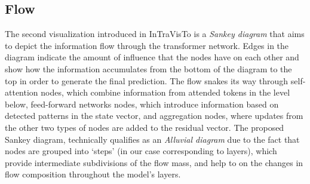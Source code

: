 \subsection{Flow}

The second visualization introduced in InTraVisTo is a \emph{Sankey diagram} that aims to depict the information flow through the transformer network.
Edges in the diagram indicate the amount of influence that the nodes have on each other and show how the information accumulates from the bottom of the diagram to the top in order to generate the final prediction.
The flow snakes its way through self-attention nodes, which combine information from attended tokens in the level below, feed-forward networks nodes, which introduce information based on detected patterns in the state vector, and aggregation nodes, where updates from the other two types of nodes are added to the residual vector.
The proposed Sankey diagram, technically qualifies as an \emph{Alluvial diagram} due to the fact that nodes are grouped into `steps' (in our case corresponding to layers), which provide intermediate subdivisions of the flow mass, and help to  on the changes in flow composition throughout the model's layers.

